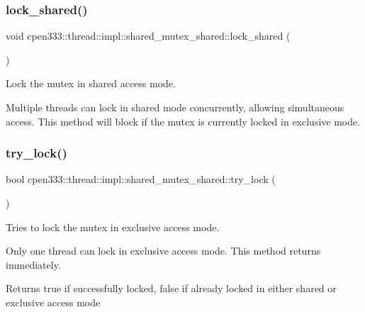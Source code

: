 \subsubsection{\texorpdfstring{lock\+\_\+shared()}{lock\_shared()}}
{\footnotesize\ttfamily void cpen333\+::thread\+::impl\+::shared\+\_\+mutex\+\_\+shared\+::lock\+\_\+shared (\begin{DoxyParamCaption}{ }\end{DoxyParamCaption})\hspace{0.3cm}{\ttfamily [inline]}}



Lock the mutex in shared access mode. 

Multiple threads can lock in shared mode concurrently, allowing simultaneous access. This method will block if the mutex is currently locked in exclusive mode. \mbox{\label{classcpen333_1_1thread_1_1impl_1_1shared__mutex__shared_af7503e29c3774dad7db5c7bfffa4d6dc}} 
\subsubsection{\texorpdfstring{try\+\_\+lock()}{try\_lock()}}
{\footnotesize\ttfamily bool cpen333\+::thread\+::impl\+::shared\+\_\+mutex\+\_\+shared\+::try\+\_\+lock (\begin{DoxyParamCaption}{ }\end{DoxyParamCaption})\hspace{0.3cm}{\ttfamily [inline]}}



Tries to lock the mutex in exclusive access mode. 

Only one thread can lock in exclusive access mode. This method returns immediately.

\begin{DoxyReturn}{Returns}
true if successfully locked, false if already locked in either shared or exclusive access mode 
\end{DoxyReturn}
\mbox{\label{classcpen333_1_1thread_1_1impl_1_1shared__mutex__shared_a354b81f50045cbb68a8bb295222e4b5b}} 
